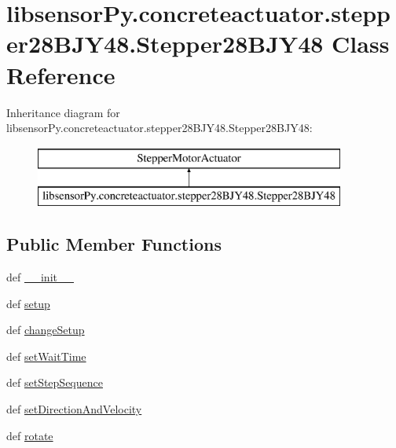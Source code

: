 \hypertarget{classlibsensorPy_1_1concreteactuator_1_1stepper28BJY48_1_1Stepper28BJY48}{}\section{libsensor\+Py.\+concreteactuator.\+stepper28\+B\+J\+Y48.\+Stepper28\+B\+J\+Y48 Class Reference}
\label{classlibsensorPy_1_1concreteactuator_1_1stepper28BJY48_1_1Stepper28BJY48}
Inheritance diagram for libsensor\+Py.\+concreteactuator.\+stepper28\+B\+J\+Y48.\+Stepper28\+B\+J\+Y48\+:\begin{figure}[H]
\begin{center}
\leavevmode
\includegraphics[height=2.000000cm]{classlibsensorPy_1_1concreteactuator_1_1stepper28BJY48_1_1Stepper28BJY48}
\end{center}
\end{figure}
\subsection*{Public Member Functions}
\begin{DoxyCompactItemize}
\item 
def \hyperlink{classlibsensorPy_1_1concreteactuator_1_1stepper28BJY48_1_1Stepper28BJY48_a4038b88f8966bbeb459fcc8e76a564e4}{\+\_\+\+\_\+init\+\_\+\+\_\+}
\item 
def \hyperlink{classlibsensorPy_1_1concreteactuator_1_1stepper28BJY48_1_1Stepper28BJY48_aec0c4f32120673c738f193edfb8573ef}{setup}
\item 
def \hyperlink{classlibsensorPy_1_1concreteactuator_1_1stepper28BJY48_1_1Stepper28BJY48_a88a1e9fa942ed22fcd49d8b7fdd5f5f2}{change\+Setup}
\item 
def \hyperlink{classlibsensorPy_1_1concreteactuator_1_1stepper28BJY48_1_1Stepper28BJY48_a55bc5bdb7dd5c07c4aa8d8c6dfc40640}{set\+Wait\+Time}
\item 
def \hyperlink{classlibsensorPy_1_1concreteactuator_1_1stepper28BJY48_1_1Stepper28BJY48_a8f1f0a28ef16cede1c1ad6cd42f88b15}{set\+Step\+Sequence}
\item 
def \hyperlink{classlibsensorPy_1_1concreteactuator_1_1stepper28BJY48_1_1Stepper28BJY48_aab59d6b52c4052f9542f976956b3393b}{set\+Direction\+And\+Velocity}
\item 
def \hyperlink{classlibsensorPy_1_1concreteactuator_1_1stepper28BJY48_1_1Stepper28BJY48_a0ebf8f0c3a1dea0ee13539f3deb4cfce}{rotate}
\end{DoxyCompactItemize}
